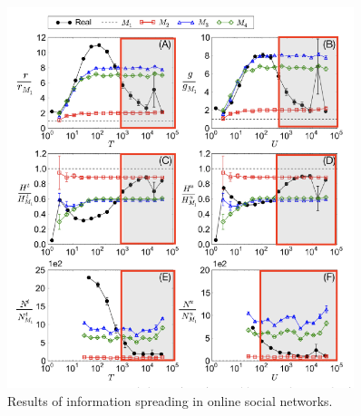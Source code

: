 \documentclass[../main/main.tex]{subfiles}
\begin{document}
\begin{figure}[h!]
\centering
\includegraphics[width=0.9\textwidth]{../lessons/image/11/6.png}
\caption{\label{fig:11_6} Results of information spreading in online social networks.}
\end{figure}
\end{document}

